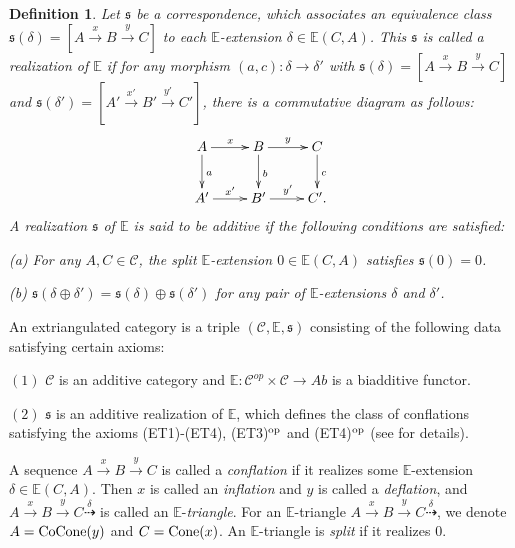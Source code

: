 \documentclass[11pt,a4paper]{amsart}
\numberwithin{equation}{section}
\theoremstyle{plain}
\newtheorem{definition}[thm]{Definition}
\begin{document}
\begin{definition}
	\cite[Definition 2.9]{NP} Let $\mathfrak{s}$ be a correspondence, which associates an equivalence class $\mathfrak{s}(\delta)=[A\stackrel{x}{\longrightarrow}B\stackrel{y}{\longrightarrow}C]$ to each $\mathbb{E}$-extension $\delta\in\mathbb{E}(C,A)$. This $\mathfrak{s}$ is called a {\em realization} of $\mathbb{E}$ if for any morphism $(a,c):\delta\rightarrow \delta'$ with $\mathfrak{s}(\delta)=[A\stackrel{x}{\longrightarrow}B\stackrel{y}{\longrightarrow}C]$ and $\mathfrak{s}(\delta')=[A'\stackrel{x'}{\longrightarrow}B'\stackrel{y'}{\longrightarrow}C']$, there is a commutative diagram as follows:
	$$\xymatrix{A \ar[r]^x \ar[d]^a& B\ar[r]^y \ar[d]^b&C\ar[d]^c\\
		A'\ar[r]^{x'}&B'\ar[r]^{y'}&C'.}
	$$
	A realization $\mathfrak{s}$ of $\mathbb{E}$ is said to be {\em additive} if the following conditions are satisfied:
	
	\;(a) For any $A,C\in\mathscr{C}$, the split $\mathbb{E}$-extension $0\in\mathbb{E}(C,A)$ satisfies $\mathfrak{s}(0)=0$.
	
	\;(b) $\mathfrak{s}(\delta\oplus \delta')=\mathfrak{s}(\delta)\oplus\mathfrak{s}(\delta')$ for any pair of $\mathbb{E}$-extensions $\delta$ and $\delta'$.
\end{definition}

An extriangulated category is a triple $(\mathscr{C},\mathbb{E},\mathfrak{s})$ consisting of the following data satisfying
certain axioms:

$(1)$ $\mathscr{C}$ is an additive category and $\mathbb{E}:\mathscr{C}^{op}\times\mathscr{C}\rightarrow Ab$ is a biadditive functor.

$(2)$ $\mathfrak{s}$ is an additive realization of $\mathbb{E}$, which defines the class of conflations satisfying the
axioms (ET1)-(ET4), (ET3)$^{\rm op}$ and (ET4)$^{\rm op}$ (see \cite[Definition 2.12]{NP} for details).

A sequence $A\stackrel{x}{\longrightarrow}B\stackrel{y}{\longrightarrow}C$ is called a {\em conflation} if it realizes some $\mathbb{E}$-extension $\delta\in\mathbb{E}(C,A)$. Then $x$ is called an {\em inflation} and $y$ is called a {\em deflation}, and $A\stackrel{x}{\longrightarrow}B\stackrel{y}{\longrightarrow}C\stackrel{\delta}{\dashrightarrow}$ is called an $\mathbb{E}$-{\em triangle}.
For an $\mathbb{E}$-triangle $A\stackrel{x}{\longrightarrow}B\stackrel{y}{\longrightarrow}C\stackrel{\delta}{\dashrightarrow}$, we denote $A={\rm CoCone}(y)$ and $C={\rm Cone}(x)$. An $\mathbb{E}$-triangle is {\em split} if it realizes $0$.\\
\end{document}
